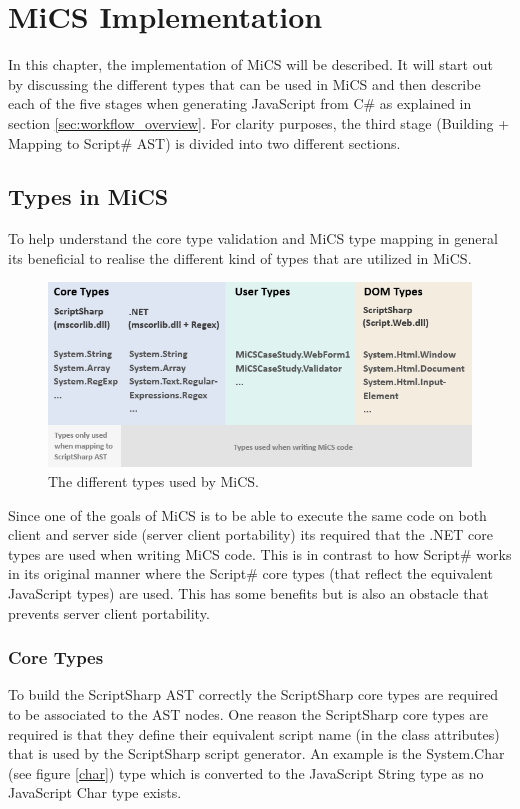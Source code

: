 \chapter{MiCS Implementation}
	In this chapter, the implementation of MiCS will be described. It will start out by discussing the different types that can be used in MiCS and then describe each of the five stages when generating JavaScript from C\# as explained in section \ref{sec:workflow_overview}. For clarity purposes, the third stage (Building + Mapping to Script\# AST) is divided into two different sections.


\section{Types in MiCS} %
\label{sec:types_in_mics}
	To help understand the core type validation and MiCS type mapping in general its beneficial to realise the different kind of types that are utilized in MiCS.

	\begin{figure}[H]
		\begin{center}
			\centerline{\includegraphics[width=16cm]{resources/images/TypesOverview.png}}
		\end{center}
		\caption{The different types used by MiCS.}
		\label{typesOverview}
	\end{figure}

	Since one of the goals of MiCS is to be able to execute the same code on both client and server side (server client portability) its required that the .NET core types are used when writing MiCS code. This is in contrast to how Script\# works in its original manner where the Script\# core types (that reflect the equivalent JavaScript types) are used. This has some benefits but is also an obstacle that prevents server client portability.

	\subsection{Core Types} %
	\label{sub:core_types}
		To build the ScriptSharp AST correctly the ScriptSharp core types are required to be associated to the AST nodes. One reason the ScriptSharp core types are required is that they define their equivalent script name (in the class attributes) that is used by the ScriptSharp script generator. An example is the System.Char (see figure \ref{char}) type which is converted to the JavaScript String type as no JavaScript Char type exists.

